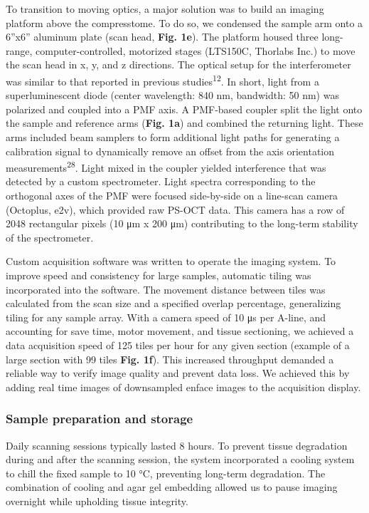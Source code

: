 \documentclass{article}
\begin{document}
To transition to moving optics, a major solution was to build an imaging platform above the compresstome. To do so, we condensed the sample arm onto a 6”x6” aluminum plate (scan head, \textbf{Fig. 1e}). The platform housed three long-range, computer-controlled, motorized stages (LTS150C, Thorlabs Inc.) to move the scan head in x, y, and z directions. The optical setup for the interferometer was similar to that reported in previous studies\textsuperscript{12}. In short, light from a superluminescent diode (center wavelength: 840 nm, bandwidth: 50 nm) was polarized and coupled into a PMF axis. A PMF-based coupler split the light onto the sample and reference arms (\textbf{Fig. 1a}) and combined the returning light. These arms included beam samplers to form additional light paths for generating a calibration signal to dynamically remove an offset from the axis orientation measurements\textsuperscript{28}. Light mixed in the coupler yielded interference that was detected by a custom spectrometer. Light spectra corresponding to the orthogonal axes of the PMF were focused side-by-side on a line-scan camera (Octoplus, e2v), which provided raw PS-OCT data. This camera has a row of 2048 rectangular pixels (10 μm x 200 μm) contributing to the long-term stability of the spectrometer.

Custom acquisition software was written to operate the imaging system. To improve speed and consistency for large samples, automatic tiling was incorporated into the software. The movement distance between tiles was calculated from the scan size and a specified overlap percentage, generalizing tiling for any sample array. With a camera speed of 10 μs per A-line, and accounting for save time, motor movement, and tissue sectioning, we achieved a data acquisition speed of 125 tiles per hour for any given section (example of a large section with 99 tiles \textbf{Fig. 1f}). This increased throughput demanded a reliable way to verify image quality and prevent data loss. We achieved this by adding real time images of downsampled enface images to the acquisition display.

\subsubsection*{Sample preparation and storage}

Daily scanning sessions typically lasted 8 hours. To prevent tissue degradation during and after the scanning session, the system incorporated a cooling system to chill the fixed sample to 10 °C, preventing long-term degradation. The combination of cooling and agar gel embedding allowed us to pause imaging overnight while upholding tissue integrity.
\end{document}
